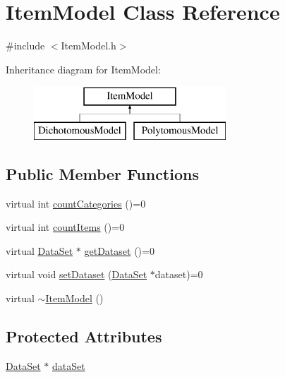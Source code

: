 \hypertarget{classItemModel}{}\section{Item\+Model Class Reference}
\label{classItemModel}


{\ttfamily \#include $<$Item\+Model.\+h$>$}

Inheritance diagram for Item\+Model\+:\begin{figure}[H]
\begin{center}
\leavevmode
\includegraphics[height=2.000000cm]{classItemModel}
\end{center}
\end{figure}
\subsection*{Public Member Functions}
\begin{DoxyCompactItemize}
\item 
virtual int \hyperlink{classItemModel_af0aabe9f48c6d111fbcb903cb330fae7}{count\+Categories} ()=0
\item 
virtual int \hyperlink{classItemModel_a7a93c60e346f4d80f265a4c9e083181d}{count\+Items} ()=0
\item 
virtual \hyperlink{classDataSet}{Data\+Set} $\ast$ \hyperlink{classItemModel_a8521ea3f8f511e88d5257ff7591cd928}{get\+Dataset} ()=0
\item 
virtual void \hyperlink{classItemModel_accd6c6b6827c45970d04c22baaca6b0c}{set\+Dataset} (\hyperlink{classDataSet}{Data\+Set} $\ast$dataset)=0
\item 
virtual \hyperlink{classItemModel_ac824a8715e939060d4efdee0949d02cf}{$\sim$\+Item\+Model} ()
\end{DoxyCompactItemize}
\subsection*{Protected Attributes}
\begin{DoxyCompactItemize}
\item 
\hyperlink{classDataSet}{Data\+Set} $\ast$ \hyperlink{classItemModel_a160f86bf5a0eba987f4c8a8499e448a6}{data\+Set}
\end{DoxyCompactItemize}


